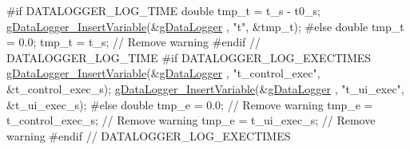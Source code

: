 \begin{DoxyCode}
\textcolor{preprocessor}{    #if DATALOGGER\_LOG\_TIME}
\textcolor{preprocessor}{}    \textcolor{keywordtype}{double} tmp\_t = t\_s - t0\_s;
    \hyperlink{gdatalogger_8c_a32674e7c2afa8b78e99a0070cf4bcaf9}{gDataLogger\_InsertVariable}(&\hyperlink{datalogger_01_07Caio-PC's_01conflicted_01copy_012012-11-23_08_8c_abe3b9c2c4e21e79c7b046b5986d13acc}{gDataLogger}
      , \textcolor{stringliteral}{"t"}, &tmp\_t);
\textcolor{preprocessor}{    #else}
\textcolor{preprocessor}{}    \textcolor{keywordtype}{double} tmp\_t = 0.0;
    tmp\_t = t\_s; \textcolor{comment}{// Remove warning}
\textcolor{preprocessor}{    #endif // DATALOGGER\_LOG\_TIME}
\textcolor{preprocessor}{}
\textcolor{preprocessor}{    #if DATALOGGER\_LOG\_EXECTIMES}
\textcolor{preprocessor}{}    \hyperlink{gdatalogger_8c_a32674e7c2afa8b78e99a0070cf4bcaf9}{gDataLogger\_InsertVariable}(&\hyperlink{datalogger_01_07Caio-PC's_01conflicted_01copy_012012-11-23_08_8c_abe3b9c2c4e21e79c7b046b5986d13acc}{gDataLogger}
      , \textcolor{stringliteral}{"t\_control\_exec"}, &t\_control\_exec\_s);
    \hyperlink{gdatalogger_8c_a32674e7c2afa8b78e99a0070cf4bcaf9}{gDataLogger\_InsertVariable}(&\hyperlink{datalogger_01_07Caio-PC's_01conflicted_01copy_012012-11-23_08_8c_abe3b9c2c4e21e79c7b046b5986d13acc}{gDataLogger}
      , \textcolor{stringliteral}{"t\_ui\_exec"}, &t\_ui\_exec\_s);
\textcolor{preprocessor}{    #else}
\textcolor{preprocessor}{}    \textcolor{keywordtype}{double} tmp\_e = 0.0; \textcolor{comment}{// Remove warning}
    tmp\_e = t\_control\_exec\_s; \textcolor{comment}{// Remove warning}
    tmp\_e = t\_ui\_exec\_s; \textcolor{comment}{// Remove warning}
\textcolor{preprocessor}{    #endif // DATALOGGER\_LOG\_EXECTIMES}
\textcolor{preprocessor}{}


\end{DoxyCode}
